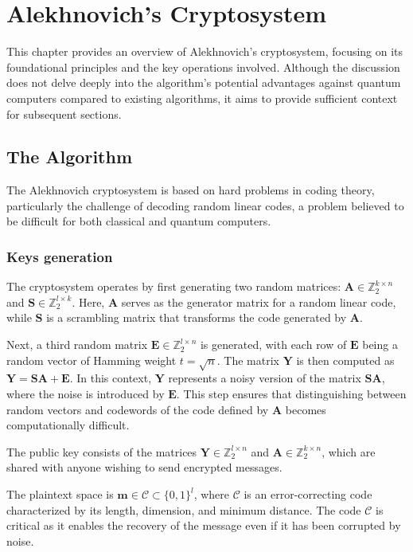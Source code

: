 \chapter{Alekhnovich's Cryptosystem}

This chapter provides an overview of Alekhnovich's cryptosystem, focusing on its foundational principles and the key operations involved. Although the discussion does not delve deeply into the algorithm's potential advantages against quantum computers compared to existing algorithms, it aims to provide sufficient context for subsequent sections.

\section{The Algorithm}
The Alekhnovich cryptosystem \cite{DBLP:journals/cc/Alekhnovich11a} is based on hard problems in coding theory, particularly the challenge of decoding random linear codes, a problem believed to be difficult for both classical and quantum computers.

\subsection{Keys generation}
The cryptosystem operates by first generating two random matrices: $\mathbf{A} \in \mathbb{Z}^{k \times n}_2$ and $\mathbf{S} \in \mathbb{Z}^{l \times k}_2$. Here, $\mathbf{A}$ serves as the generator matrix for a random linear code, while $\mathbf{S}$ is a scrambling matrix that transforms the code generated by $\mathbf{A}$.

Next, a third random matrix $\mathbf{E} \in \mathbb{Z}^{l \times n}_2$ is generated, with each row of $\mathbf{E}$ being a random vector of Hamming weight $t = \sqrt{n}$. The matrix $\mathbf{Y}$ is then computed as $\mathbf{Y} = \mathbf{SA} + \mathbf{E}$. In this context, $\mathbf{Y}$ represents a noisy version of the matrix $\mathbf{SA}$, where the noise is introduced by $\mathbf{E}$. This step ensures that distinguishing between random vectors and codewords of the code defined by $\mathbf{A}$ becomes computationally difficult.

The public key consists of the matrices $\mathbf{Y} \in \mathbb{Z}^{l \times n}_2$ and $\mathbf{A} \in \mathbb{Z}^{k \times n}_2$, which are shared with anyone wishing to send encrypted messages.

The plaintext space is $\mathbf{m} \in \mathcal{C} \subset \{0,1\}^l$, where $\mathcal{C}$ is an error-correcting code characterized by its length, dimension, and minimum distance. The code $\mathcal{C}$ is critical as it enables the recovery of the message even if it has been corrupted by noise.

